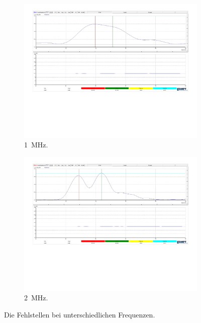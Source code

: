 \begin{figure}%
    \begin{subfigure}{0.48\textwidth}%
        \centering%
        \includegraphics[width=\textwidth]{Messdaten/aufloesung 1mhz zoom.pdf}%
        \caption{\qty{1}{\mega\hertz}.}%
        \label{fig:aufloesung_a}%
    \end{subfigure}%
    \hfill%
    \begin{subfigure}{0.48\textwidth}%
        \centering%
        \includegraphics[width=\textwidth]{Messdaten/aufloesung 2mhz zoom.pdf}%
        \caption{\qty{2}{\mega\hertz}.}%
        \label{fig:aufloesung_b}%
    \end{subfigure}%
    \caption{Die Fehlstellen bei unterschiedlichen Frequenzen.}%
    \label{fig:aufloesung}%
\end{figure}%

